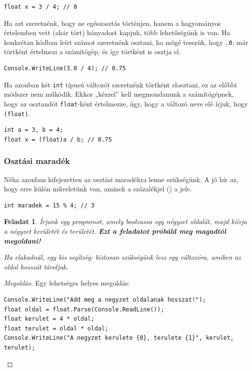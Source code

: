 \documentclass[a4paper]{article}
\newtheorem{ex}[thm]{Feladat} %
\newenvironment{solution} {\begin{proof}[Megoldás]} {\end{proof}}
\begin{document}
\begin{lstlisting}[caption=Egészosztás tört változóval, label=lst:intDivFloatVar]
float x = 3 / 4; // 0
\end{lstlisting}

Ha azt szeretnénk, hogy ne egészosztás történjen, hanem a hagyományos értelemben vett (akár tört) hányadost kapjuk, több lehetőségünk is van. Ha konkrétan kódban leírt számot szeretnénk osztani, ha mögé tesszük, hogy \lstinline{.0}, már törtként értelmezi a számítógép, és így törtként is osztja el.

\begin{lstlisting}[caption=Tört osztása, label=lst:div]
Console.WriteLine(3.0 / 4); // 0.75
\end{lstlisting}

Ha azonban két \lstinline{int} típusú változót szeretnénk törtként elosztani, ez az előbbi módszer nem működik. Ekkor „kézzel” kell megmondanunk a számítógépnek, hogy az osztandót \lstinline{float}-ként értelmezze, úgy, hogy a változó neve elé írjuk, hogy \lstinline{(float)}.

\begin{lstlisting}[caption=Tört osztása \lstinline{floart}-tá alakítással, label=lst:divFloatCast]
int a = 3, b = 4;
float x = (float)a / b; // 0.75
\end{lstlisting}

\subsubsection{Osztási maradék}
Néha azonban kifejezetten az osztási maradékra lenne szükségünk. A jó hír az, hogy erre külön műveletünk van, aminek a százalékjel (\within{\lstinline{\%}}) a jele.

\begin{lstlisting}[caption=Osztási maradék, label=lst:divRem]
int maradek = 15 % 4; // 3
\end{lstlisting}

\begin{ex}
Írjunk egy programot, amely beolvassa egy négyzet oldalát, majd kiírja a négyzet kerületét és területét.
\textbf{Ezt a feladatot próbáld meg magadtól megoldani!}

Ha elakadnál, egy kis segítség: biztosan szükségünk lesz egy változóra, amiben az oldal hosszát tároljuk.
\end{ex}

\begin{solution}
Egy lehetséges helyes megoldás:

\begin{lstlisting}[caption=Négyzet kerülete és területe, label=lst:slnSquare]
Console.WriteLine("Add meg a negyzet oldalanak hosszat!");
float oldal = float.Parse(Console.ReadLine());
float kerulet = 4 * oldal;
float terulet = oldal * oldal;
Console.WriteLine("A negyzet kerulete {0}, terulete {1}", kerulet, terulet);
\end{lstlisting}
\end{solution}
\end{document}
